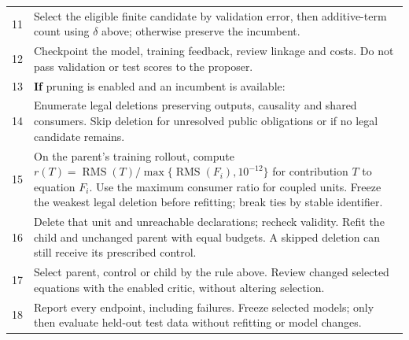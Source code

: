 \begin{table}[!htbp]
\begin{tabularx}{\textwidth}{@{}rX@{}}
11 & \qquad Select the eligible finite candidate by validation error, then
 additive-term count using $\delta$ above; otherwise preserve the incumbent.\\
12 & \qquad Checkpoint the model, training feedback, review linkage and
 costs. Do not pass validation or test scores to the proposer.\\
13 & \quad \textbf{If} pruning is enabled and an incumbent is available:\\
14 & \qquad Enumerate legal deletions preserving outputs, causality and
 shared consumers. Skip deletion for unresolved public obligations or
 if no legal candidate remains.\\
15 & \qquad On the parent's training rollout, compute
 $r(T)=\operatorname{RMS}(T)/\max\{\operatorname{RMS}(F_i),10^{-12}\}$
 for contribution $T$ to equation $F_i$. Use the maximum consumer ratio for
 coupled units. Freeze the weakest legal deletion before refitting; break
 ties by stable identifier.\\
16 & \qquad Delete that unit and unreachable declarations; recheck validity.
 Refit the child and unchanged parent with equal budgets. A skipped deletion
 can still receive its prescribed control.\\
17 & \qquad Select parent, control or child by the rule above. Review changed
 selected equations with the enabled critic, without altering selection.\\
18 & Report every endpoint, including failures. Freeze selected models;
 only then evaluate held-out test data without refitting or model changes.\\
\bottomrule
\end{tabularx}
\end{table}
